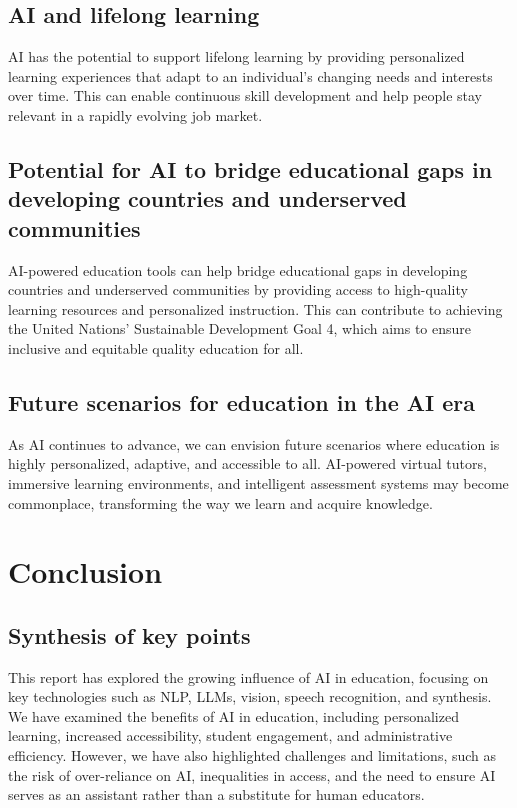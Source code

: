 \documentclass{article}
\begin{document}
\subsection{AI and lifelong learning}
AI has the potential to support lifelong learning by providing personalized learning experiences that adapt to an individual's changing needs and interests over time. This can enable continuous skill development and help people stay relevant in a rapidly evolving job market.

\subsection{Potential for AI to bridge educational gaps in developing countries and underserved communities}
AI-powered education tools can help bridge educational gaps in developing countries and underserved communities by providing access to high-quality learning resources and personalized instruction. This can contribute to achieving the United Nations' Sustainable Development Goal 4, which aims to ensure inclusive and equitable quality education for all.

\subsection{Future scenarios for education in the AI era}
As AI continues to advance, we can envision future scenarios where education is highly personalized, adaptive, and accessible to all. AI-powered virtual tutors, immersive learning environments, and intelligent assessment systems may become commonplace, transforming the way we learn and acquire knowledge.

\newpage
\section{Conclusion}

\subsection{Synthesis of key points}
This report has explored the growing influence of AI in education, focusing on key technologies such as NLP, LLMs, vision, speech recognition, and synthesis. We have examined the benefits of AI in education, including personalized learning, increased accessibility, student engagement, and administrative efficiency. However, we have also highlighted challenges and limitations, such as the risk of over-reliance on AI, inequalities in access, and the need to ensure AI serves as an assistant rather than a substitute for human educators.
\end{document}
